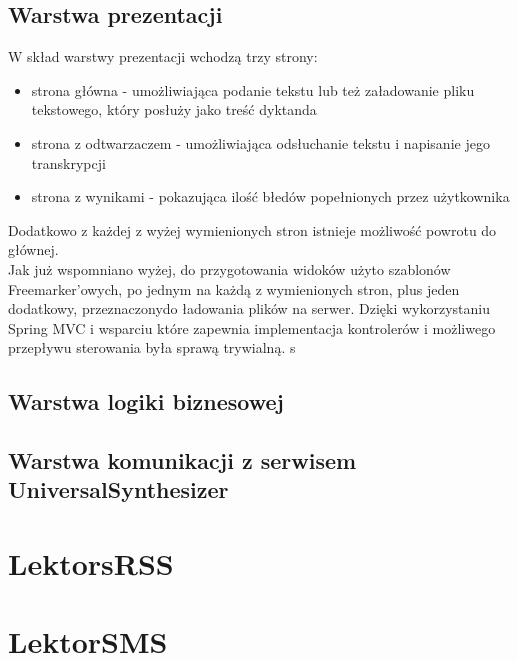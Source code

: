 \subsection{Warstwa prezentacji}
W skład warstwy prezentacji wchodzą trzy strony:
\begin{itemize}
	\item strona główna - umożliwiająca podanie tekstu lub też załadowanie pliku tekstowego, który posłuży jako treść dyktanda
	\item strona z odtwarzaczem - umożliwiająca odsłuchanie tekstu i napisanie jego transkrypcji
	\item strona z wynikami - pokazująca ilość błedów popełnionych przez użytkownika
\end{itemize}
Dodatkowo z każdej z wyżej wymienionych stron istnieje możliwość powrotu do głównej. \\
Jak już wspomniano wyżej, do przygotowania widoków użyto szablonów Freemarker'owych, po jednym na każdą z wymienionych stron, plus jeden dodatkowy, przeznaczonydo ładowania plików na serwer. Dzięki wykorzystaniu Spring MVC i wsparciu które zapewnia implementacja kontrolerów i możliwego przepływu sterowania była sprawą trywialną. s
\subsection{Warstwa logiki biznesowej}

\subsection{Warstwa komunikacji z serwisem UniversalSynthesizer}

\section{LektorsRSS}

\section{LektorSMS}





